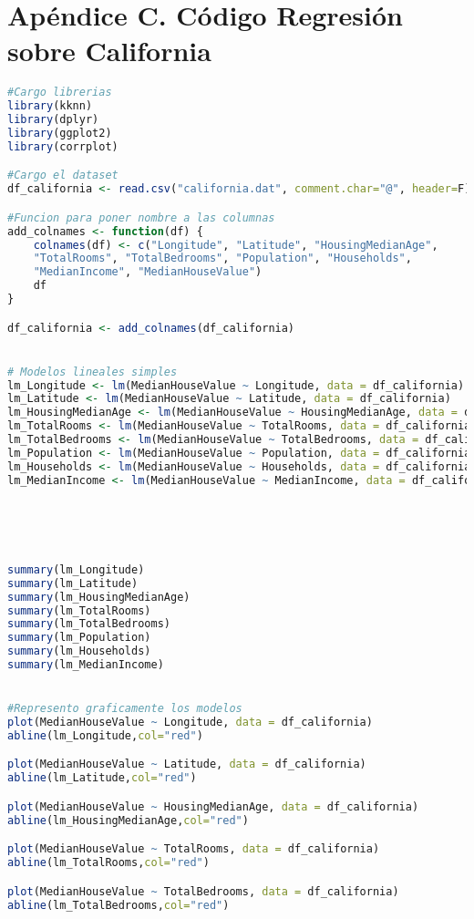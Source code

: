 \section{Apéndice C. Código Regresión sobre California}

\begin{lstlisting}[language=R]
#Cargo librerias
library(kknn)
library(dplyr)
library(ggplot2)
library(corrplot)

#Cargo el dataset
df_california <- read.csv("california.dat", comment.char="@", header=F)

#Funcion para poner nombre a las columnas
add_colnames <- function(df) {
	colnames(df) <- c("Longitude", "Latitude", "HousingMedianAge",
	"TotalRooms", "TotalBedrooms", "Population", "Households",
	"MedianIncome", "MedianHouseValue")
	df
}

df_california <- add_colnames(df_california)


# Modelos lineales simples
lm_Longitude <- lm(MedianHouseValue ~ Longitude, data = df_california)
lm_Latitude <- lm(MedianHouseValue ~ Latitude, data = df_california)
lm_HousingMedianAge <- lm(MedianHouseValue ~ HousingMedianAge, data = df_california)
lm_TotalRooms <- lm(MedianHouseValue ~ TotalRooms, data = df_california)
lm_TotalBedrooms <- lm(MedianHouseValue ~ TotalBedrooms, data = df_california)
lm_Population <- lm(MedianHouseValue ~ Population, data = df_california)
lm_Households <- lm(MedianHouseValue ~ Households, data = df_california)
lm_MedianIncome <- lm(MedianHouseValue ~ MedianIncome, data = df_california)





summary(lm_Longitude)
summary(lm_Latitude)
summary(lm_HousingMedianAge)
summary(lm_TotalRooms)
summary(lm_TotalBedrooms)
summary(lm_Population)
summary(lm_Households)
summary(lm_MedianIncome)


#Represento graficamente los modelos
plot(MedianHouseValue ~ Longitude, data = df_california)
abline(lm_Longitude,col="red")

plot(MedianHouseValue ~ Latitude, data = df_california)
abline(lm_Latitude,col="red")

plot(MedianHouseValue ~ HousingMedianAge, data = df_california)
abline(lm_HousingMedianAge,col="red")

plot(MedianHouseValue ~ TotalRooms, data = df_california)
abline(lm_TotalRooms,col="red")

plot(MedianHouseValue ~ TotalBedrooms, data = df_california)
abline(lm_TotalBedrooms,col="red")


\end{lstlisting}
